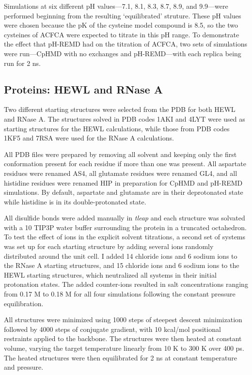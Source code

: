 Simulations at six different pH values---7.1, 8.1, 8.3, 8.7, 8.9, and 9.9---were
performed beginning from the resulting `equilibrated' struture.  These pH values
were chosen because the pK of the cysteine model compound is 8.5, so the
two cysteines of ACFCA were expected to titrate in this pH range.  To
demonstrate the effect that pH-REMD had on the titration of ACFCA, two sets of
simulations were run---CpHMD with no exchanges and pH-REMD---with each replica
being run for 2 ns.

\subsection{Proteins: HEWL and RNase A}

Two different starting structures were selected from the PDB for both HEWL and
RNase A. The structures solved in PDB codes 1AKI
\cite{Artymiuk_ActaCrystB_1982_v38_p778} and 4LYT
\cite{Young_JApplCryst_1993_v26_p309} were used as starting structures for the
HEWL calculations, while those from PDB codes 1KF5
\cite{Berisio_ActaCrystallogrD_2002_v58_p441} and 7RSA
\cite{Wlodawer_Biochemistry_1988_v27_p2705} were used for the RNase A
calculations.

All PDB files were prepared by removing all solvent and keeping only the first
conformation present for each residue if more than one was present. All
aspartate residues were renamed AS4, all glutamate residues were renamed GL4,
and all histidine residues were renamed HIP in preparation for CpHMD and pH-REMD
simulations. By default, aspartate and glutamate are in their deprotonated state
while histidine is in its double-protonated state.

All disulfide bonds were added manually in \emph{tleap} and each structure was
solvated with a 10 \text{\AA} TIP3P water buffer surrounding the protein in a
truncated octahedron. To test the effect of ions in the explicit solvent
titrations, a second set of systems was set up for each starting structure by
adding several ions randomly distributed around the unit cell. I added 14
chloride ions and 6 sodium ions to the RNase A starting structures, and 15
chloride ions and 6 sodium ions to the HEWL starting structures, which
neutralized all systems in their initial protonation states.  The added
counter-ions resulted in salt concentrations ranging from 0.17 M to 0.18 M for
all four simulations following the constant pressure equilibration.

All structures were minimized using 1000 steps of steepest descent minimization
followed by 4000 steps of conjugate gradient, with 10 kcal/mol positional
restraints applied to the backbone. The structures were then heated at constant
volume, varying the target temperature linearly from 10 K to 300 K over 400 ps.
The heated structures were then equilibrated for 2 ns at constant temperature
and pressure.

